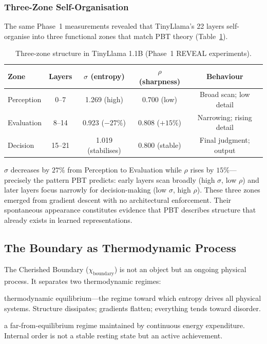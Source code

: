\documentclass[12pt,a4paper]{article}
\newcommand{\chiB}{\chi_{\mathrm{boundary}}}
\newcommand{\pp}[1]{\textbf{#1}}
\begin{document}
\subsubsection{Three-Zone Self-Organisation}

The same Phase~1 measurements revealed that TinyLlama's 22 layers self-organise
into three functional zones that match PBT theory (Table~\ref{tab:three_zones}).

\begin{table}[ht]
\centering
\caption{Three-zone structure in TinyLlama 1.1B (Phase~1 REVEAL experiments).}
\label{tab:three_zones}
\small
\begin{tabular}{@{}lcccc@{}}
\toprule
\textbf{Zone} & \textbf{Layers}
  & $\sigma$ (entropy) & $\rho$ (sharpness) & \textbf{Behaviour} \\
\midrule
Perception & 0--7   & 1.269 (high)       & 0.700 (low)     & Broad scan; low detail \\
Evaluation & 8--14  & 0.923 ($-27\%$)    & 0.808 ($+15\%$) & Narrowing; rising detail \\
Decision   & 15--21 & 1.019 (stabilises) & 0.800 (stable)  & Final judgment; output \\
\bottomrule
\end{tabular}
\end{table}

$\sigma$ decreases by $27\%$ from Perception to Evaluation while $\rho$ rises by
$15\%$---precisely the pattern PBT predicts: early layers scan broadly
(high $\sigma$, low $\rho$) and later layers focus narrowly for decision-making
(low $\sigma$, high $\rho$). These three zones emerged from gradient descent
with no architectural enforcement. Their spontaneous appearance constitutes
evidence that PBT describes structure that already exists in learned
representations.

\subsection{The Boundary as Thermodynamic Process}

The Cherished Boundary ($\chiB$) is not an object but an ongoing physical
process. It separates two thermodynamic regimes:

\begin{description}[leftmargin=1.4em]
  \item[\pp{Outside the boundary:}] thermodynamic equilibrium---the regime
    toward which entropy drives all physical systems. Structure dissipates;
    gradients flatten; everything tends toward disorder.
  \item[\pp{Inside the boundary:}] a far-from-equilibrium regime maintained by
    continuous energy expenditure. Internal order is not a stable resting state
    but an active achievement.
\end{description}
\end{document}
